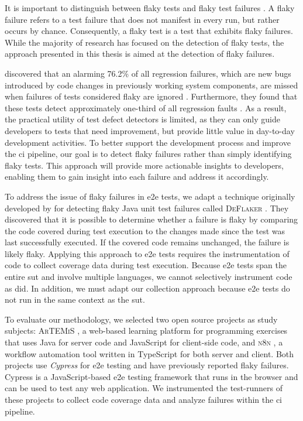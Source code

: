It is important to distinguish between flaky tests and flaky test failures \autocite{haben_importance_2023}.
A flaky failure refers to a test failure that does not manifest in every run, but rather occurs by chance.
Consequently, a flaky test is a test that exhibits flaky failures.
While the majority of research has focused on the detection of flaky tests, the approach presented in this thesis is aimed at the detection of flaky failures.

 discovered that an alarming 76.2\% of all regression failures, which are new bugs introduced by code changes in previously working system components, are missed when failures of tests considered flaky are ignored \autocite{haben_importance_2023}.
Furthermore, they found that these tests detect approximately one-third of all regression faults \autocite{haben_importance_2023}.
As a result, the practical utility of test defect detectors is limited, as they can only guide developers to tests that need improvement, but provide little value in day-to-day development activities.
To better support the development process and improve the \ac{ci} pipeline, our goal is to detect flaky failures rather than simply identifying flaky tests.
This approach will provide more actionable insights to developers, enabling them to gain insight into each failure and address it accordingly.

To address the issue of flaky failures in \ac{e2e} tests, we adapt a technique originally developed by \citeauthor*{bell_deflaker_2018} for detecting flaky Java unit test failures called \textsc{DeFlaker} \autocite{bell_deflaker_2018}.
They discovered that it is possible to determine whether a failure is flaky by comparing the code covered during test execution to the changes made since the test was last successfully executed.
If the covered code remains unchanged, the failure is likely flaky.
Applying this approach to \ac{e2e} tests requires the instrumentation of code to collect coverage data during test execution.
Because \ac{e2e} tests span the entire \ac{sut} and involve multiple languages, we cannot selectively instrument code as \citeauthor*{bell_deflaker_2018} did.
In addition, we must adapt our collection approach because \ac{e2e} tests do not run in the same context as the \ac{sut}.

To evaluate our methodology, we selected two open source projects as study subjects:
\textsc{ArTEMiS} \autocite{krusche_artemis_2018}, a web-based learning platform for programming exercises that uses Java for server code and JavaScript for client-side code, and \textsc{n8n} \autocite{noauthor_n8n_2023}, a workflow automation tool written in TypeScript for both server and client.
Both projects use \textit{Cypress} \autocite{noauthor_cypress-iocypress_2023} for \ac{e2e} testing and have previously reported flaky failures.
Cypress is a JavaScript-based \ac{e2e} testing framework that runs in the browser and can be used to test any web application.
We instrumented the test-runners of these projects to collect code coverage data and analyze failures within the \ac{ci} pipeline.

